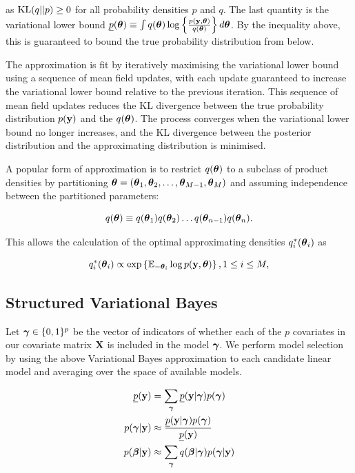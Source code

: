 \documentclass{amsart}[12pt]
\begin{document}
as $\text{KL}(q||p) \geq 0$ for all probability densities $p$ and $q$. The last quantity is the variational lower
bound $\underline{p}({\boldsymbol \theta}) \equiv \int q({\boldsymbol \theta}) \log\left\{ \frac{p({\bf y}, {\boldsymbol \theta})}{q({\boldsymbol \theta})} \right\}
d{\boldsymbol \theta}$. By the inequality above, this is guaranteed to bound the true probability distribution from below.

The approximation is fit by iteratively maximising the variational lower bound using a sequence of mean field
updates, with each update guaranteed to increase the variational lower bound relative to the previous
iteration. This sequence of mean field updates reduces the KL divergence between the true probability
distribution $p({\bf y})$ and the $q({\boldsymbol \theta})$. The process converges when the variational lower bound no longer
increases, and the KL divergence between the posterior distribution and the approximating distribution is
minimised.

A popular form of approximation is to restrict $q({\boldsymbol \theta})$ to a subclass of product densities by partitioning
${\boldsymbol \theta} = ({\boldsymbol \theta}_1, {\boldsymbol \theta}_2, \ldots, {\boldsymbol \theta}_{M-1}, {\boldsymbol \theta}_M)$ and assuming independence between the
partitioned parameters:

\begin{equation*}
	q({\boldsymbol \theta}) \equiv q({\boldsymbol \theta}_1) q({\boldsymbol \theta}_2) \ldots q({\boldsymbol \theta}_{n-1}) q({\boldsymbol \theta}_n).
\end{equation*}

This allows the calculation of the optimal approximating densities $q_i^*({\boldsymbol \theta}_i)$ as

\begin{equation*}
	q_i^*({\boldsymbol \theta}_i) \propto \exp \left \{ \mathbb{E}_{-{\boldsymbol \theta}_i} \log p({\bf y}, {\boldsymbol \theta}) \right \}, 1 \leq i \leq M,
\end{equation*}

\subsection{Structured Variational Bayes}

Let ${\boldsymbol \gamma} \in \{0, 1\}^p$ be the vector of indicators of whether each of the $p$ covariates in our
covariate matrix ${\bf X}$ is included in the model ${\boldsymbol \gamma}$. We perform model selection by using the above
Variational Bayes approximation to each  candidate linear model and averaging over the space of available
models.

\begin{align*}
	\underline{p}({\bf y}) & = \sum_{\boldsymbol \gamma} \underline{p}({\bf y}|{\boldsymbol \gamma}) p({\boldsymbol \gamma})                     \\
	p({\boldsymbol \gamma}|{\bf y})     & \approx \frac{\underline{p}({\bf y}|{\boldsymbol \gamma}) p({\boldsymbol \gamma})}{\underline{p}({\bf y})} \\
	p({\boldsymbol \beta}|{\bf y})      & \approx \sum_{\boldsymbol \gamma} q({\boldsymbol \beta}|{\boldsymbol \gamma}) p({\boldsymbol \gamma}|{\bf y})                    \\
\end{align*}
\end{document}
